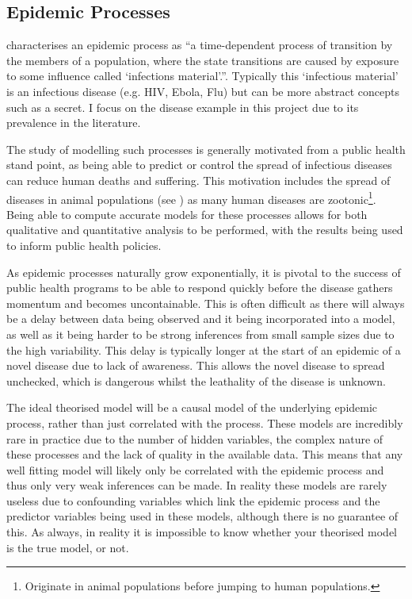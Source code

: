\documentclass[11pt,a4paper]{article}
\theoremstyle{break}
\begin{document}
\subsection{Epidemic Processes}

  \par \cite[]{epidemic_process_in_an_open_population} characterises an epidemic process as ``a time-dependent process of transition by the members of a population, where the state transitions are caused by exposure to some influence called `infections material'.''. Typically this `infectious material' is an infectious disease (e.g. HIV, Ebola, Flu) but can be more abstract concepts such as a secret. I focus on the disease example in this project due to its prevalence in the literature.


  \par The study of modelling such processes is generally motivated from a public health stand point, as being able to predict or control the spread of infectious diseases can reduce human deaths and suffering. This motivation includes the spread of diseases in animal populations (see \cite[]{dynamic_model_of_bovine_tb_spread_and_control_in_great_britain}) as many human diseases are zootonic\footnote{Originate in animal populations before jumping to human populations.}. Being able to compute accurate models for these processes allows for both qualitative and quantitative analysis to be performed, with the results being used to inform public health policies.

  \par As epidemic processes naturally grow exponentially, it is pivotal to the success of public health programs to be able to respond quickly before the disease gathers momentum and becomes uncontainable. This is often difficult as there will always be a delay between data being observed and it being incorporated into a model, as well as it being harder to be strong inferences from small sample sizes due to the high variability. This delay is typically longer at the start of an epidemic of a novel disease due to lack of awareness. This allows the novel disease to spread unchecked, which is dangerous whilst the leathality of the disease is unknown.


  \par The ideal theorised model will be a causal model of the underlying epidemic process, rather than just correlated with the process. These models are incredibly rare in practice due to the number of hidden variables, the complex nature of these processes and the lack of quality in the available data. This means that any well fitting model will likely only be correlated with the epidemic process and thus only very weak inferences can be made. In reality these models are rarely useless due to confounding variables which link the epidemic process and the predictor variables being used in these models, although there is no guarantee of this. As always, in reality it is impossible to know whether your theorised model is the true model, or not.
\end{document}

